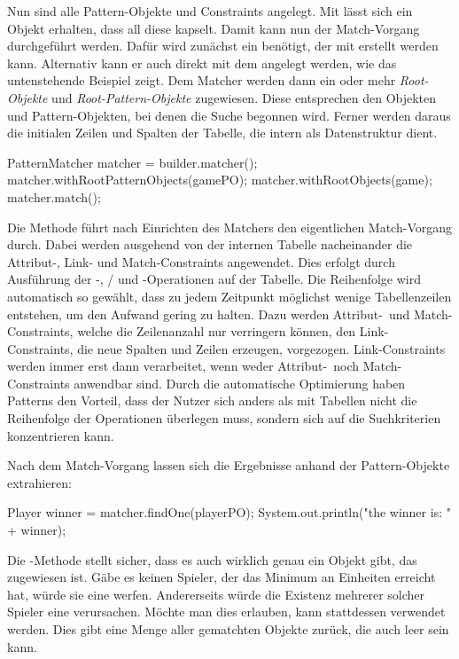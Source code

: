 Nun sind alle Pattern-Objekte und Constraints angelegt.
Mit  lässt sich ein Objekt erhalten, dass all diese kapselt.
Damit kann nun der Match-Vorgang durchgeführt werden.
Dafür wird zunächst ein  benötigt, der mit  erstellt werden kann.
Alternativ kann er auch direkt mit dem  angelegt werden, wie das untenstehende Beispiel zeigt.
Dem Matcher werden dann ein oder mehr \emph{Root-Objekte} und \emph{Root-Pattern-Objekte} zugewiesen.
Diese entsprechen den Objekten und Pattern-Objekten, bei denen die Suche begonnen wird.
Ferner werden daraus die initialen Zeilen und Spalten der Tabelle, die intern als Datenstruktur dient.

\begin{jcodeblock}
    PatternMatcher matcher = builder.matcher();
    matcher.withRootPatternObjects(gamePO);
    matcher.withRootObjects(game);
    matcher.match();
\end{jcodeblock}

Die Methode  führt nach Einrichten des Matchers den eigentlichen Match-Vorgang durch.
Dabei werden ausgehend von der internen Tabelle nacheinander die Attribut-, Link- und Match-Constraints angewendet.
Dies erfolgt durch Ausführung der -,  /  und -Operationen auf der Tabelle.
Die Reihenfolge wird automatisch so gewählt, dass zu jedem Zeitpunkt möglichst wenige Tabellenzeilen entstehen, um den Aufwand gering zu halten.
Dazu werden Attribut-\ und Match-Constraints, welche die Zeilenanzahl nur verringern können, den Link-Constraints, die neue Spalten und Zeilen erzeugen, vorgezogen.
Link-Constraints werden immer erst dann verarbeitet, wenn weder Attribut-\ noch Match-Constraints anwendbar sind.
Durch die automatische Optimierung haben Patterns den Vorteil, dass der Nutzer sich anders als mit Tabellen nicht die Reihenfolge der Operationen überlegen muss, sondern sich auf die Suchkriterien konzentrieren kann.

Nach dem Match-Vorgang lassen sich die Ergebnisse anhand der Pattern-Objekte extrahieren:

\begin{jcodeblock}
    Player winner = matcher.findOne(playerPO);
    System.out.println("the winner is: " + winner);
\end{jcodeblock}

Die -Methode stellt sicher, dass es auch wirklich genau ein Objekt gibt, das  zugewiesen ist.
Gäbe es keinen Spieler, der das Minimum an Einheiten erreicht hat, würde sie eine  werfen.
Andererseits würde die Existenz mehrerer solcher Spieler eine  verursachen.
Möchte man dies erlauben, kann stattdessen  verwendet werden.
Dies gibt eine Menge aller gematchten Objekte zurück, die auch leer sein kann.

